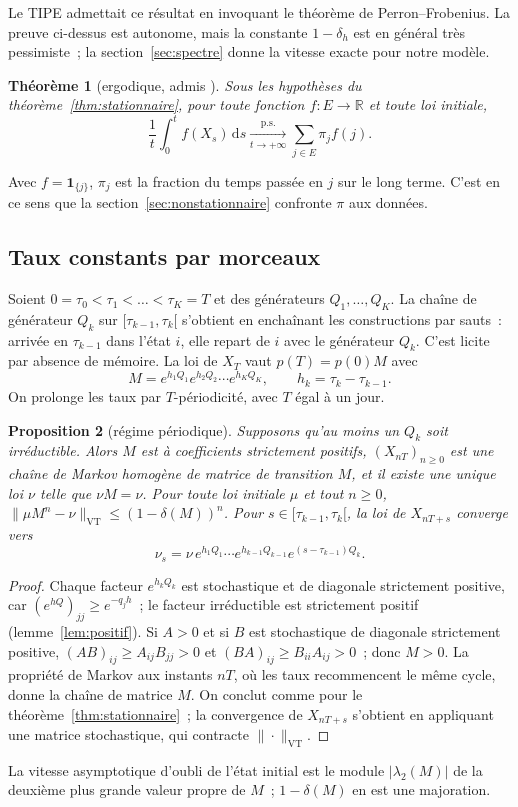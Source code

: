\documentclass[10pt,a4paper,twocolumn]{article}
\theoremstyle{enonce}
\newtheorem{theoreme}{Théorème}[section]
\newtheorem{proposition}[theoreme]{Proposition}
\theoremstyle{defi}
\newcommand{\VT}{\mathrm{VT}}
\newcommand{\dd}{\mathrm{d}}
\newcommand{\un}{\mathbf{1}}
\begin{document}
Le TIPE admettait ce résultat en invoquant le théorème de Perron--Frobenius. La preuve ci-dessus est autonome, mais la constante $1-\delta_h$ est en général très pessimiste~; la section~\ref{sec:spectre} donne la vitesse exacte pour notre modèle.

\begin{theoreme}[ergodique, admis {\cite[§3.8]{Nor97}}]\label{thm:ergodique}
Sous les hypothèses du théorème~\ref{thm:stationnaire}, pour toute fonction $f:E\to\mathbb{R}$ et toute loi initiale,
\[
\frac1t\int_0^tf(X_s)\,\dd s\xrightarrow[t\to+\infty]{\text{p.s.}}\sum_{j\in E}\pi_jf(j).
\]
\end{theoreme}

Avec $f=\un_{\{j\}}$, $\pi_j$ est la fraction du temps passée en $j$ sur le long terme. C'est en ce sens que la section~\ref{sec:nonstationnaire} confronte $\pi$ aux données.

\subsection{Taux constants par morceaux}\label{sec:periodique}

Soient $0=\tau_0<\tau_1<\dots<\tau_K=T$ et des générateurs $Q_1,\dots,Q_K$. La chaîne de générateur $Q_k$ sur $[\tau_{k-1},\tau_k[$ s'obtient en enchaînant les constructions par sauts~: arrivée en $\tau_{k-1}$ dans l'état $i$, elle repart de $i$ avec le générateur $Q_k$. C'est licite par absence de mémoire. La loi de $X_T$ vaut $p(T)=p(0)M$ avec
\[
M=e^{h_1Q_1}e^{h_2Q_2}\cdots e^{h_KQ_K},\qquad h_k=\tau_k-\tau_{k-1}.
\]
On prolonge les taux par $T$-périodicité, avec $T$ égal à un jour.

\begin{proposition}[régime périodique]\label{prop:periodique}
Supposons qu'au moins un $Q_k$ soit irréductible. Alors $M$ est à coefficients strictement positifs, $(X_{nT})_{n\geq0}$ est une chaîne de Markov homogène de matrice de transition $M$, et il existe une unique loi $\nu$ telle que $\nu M=\nu$. Pour toute loi initiale $\mu$ et tout $n\geq0$, $\|\mu M^n-\nu\|_\VT\leq(1-\delta(M))^n$. Pour $s\in[\tau_{k-1},\tau_k[$, la loi de $X_{nT+s}$ converge vers
\[
\nu_s=\nu\,e^{h_1Q_1}\cdots e^{h_{k-1}Q_{k-1}}e^{(s-\tau_{k-1})Q_k}.
\]
\end{proposition}

\begin{proof}
Chaque facteur $e^{h_kQ_k}$ est stochastique et de diagonale strictement positive, car $(e^{hQ})_{jj}\geq e^{-q_jh}$~; le facteur irréductible est strictement positif (lemme~\ref{lem:positif}). Si $A>0$ et si $B$ est stochastique de diagonale strictement positive, $(AB)_{ij}\geq A_{ij}B_{jj}>0$ et $(BA)_{ij}\geq B_{ii}A_{ij}>0$~; donc $M>0$. La propriété de Markov aux instants $nT$, où les taux recommencent le même cycle, donne la chaîne de matrice $M$. On conclut comme pour le théorème~\ref{thm:stationnaire}~; la convergence de $X_{nT+s}$ s'obtient en appliquant une matrice stochastique, qui contracte $\|\cdot\|_\VT$.
\end{proof}

La vitesse asymptotique d'oubli de l'état initial est le module $|\lambda_2(M)|$ de la deuxième plus grande valeur propre de $M$~; $1-\delta(M)$ en est une majoration.
\end{document}
